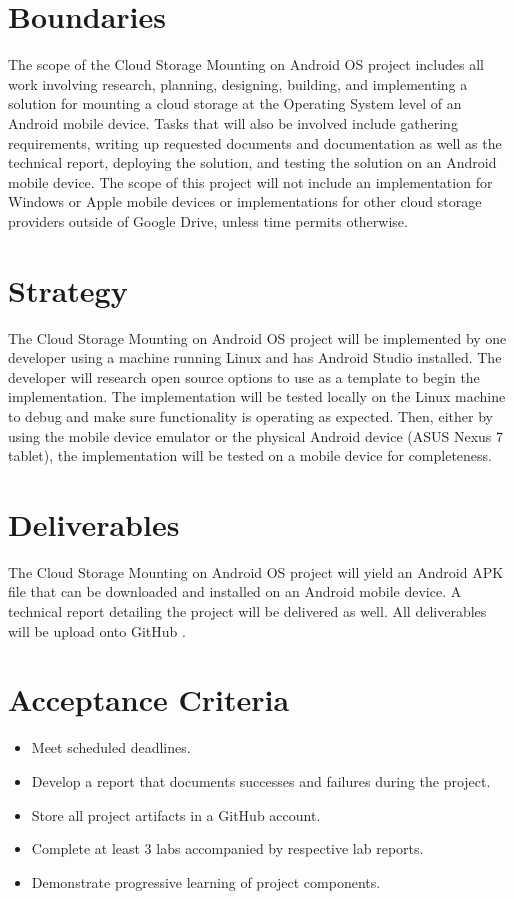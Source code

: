 \section{Boundaries}
The scope of the Cloud Storage Mounting on Android OS project includes all work involving research, planning, designing, building, and implementing a solution for mounting a cloud storage at the Operating System level of an Android mobile device. Tasks that will also be involved include gathering requirements, writing up requested documents and documentation as well as the technical report, deploying the solution, and testing the solution on an Android mobile device. The scope of this project will not include an implementation for Windows or Apple mobile devices or implementations for other cloud storage providers outside of Google Drive, unless time permits otherwise. 

\section{Strategy}
The Cloud Storage Mounting on Android OS project will be implemented by one developer using a machine running Linux and has Android Studio installed. The developer will research open source options to use as a template to begin the implementation. The implementation will be tested locally on the Linux machine to debug and make sure functionality is operating as expected. Then, either by using the mobile device emulator or the physical Android device (ASUS Nexus 7 tablet), the implementation will be tested on a mobile device for completeness. 

\section{Deliverables}
The Cloud Storage Mounting on Android OS project will yield an Android APK file that can be downloaded and installed on an Android mobile device. A technical report detailing the project will be delivered as well. All deliverables will be upload onto GitHub \cite{projectgithub}.

\section{Acceptance Criteria}
\begin{itemize}
  \item Meet scheduled deadlines.
  \item Develop a report that documents successes and failures during the project.
  \item Store all project artifacts in a GitHub account. 
  \item Complete at least 3 labs accompanied by respective lab reports.
  \item Demonstrate progressive learning of project components.
\end{itemize}

